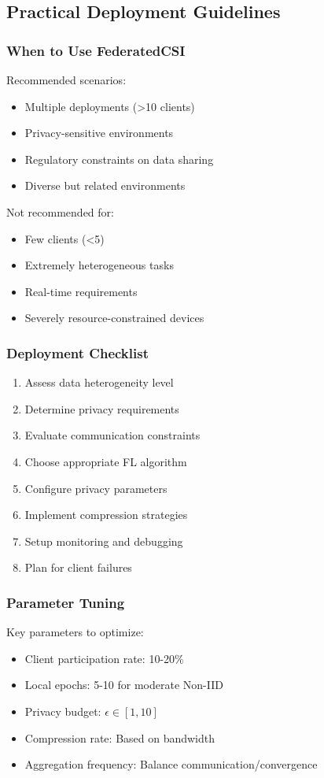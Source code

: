 \documentclass[journal]{IEEEtran}
\begin{document}
\subsection{Practical Deployment Guidelines}

\subsubsection{When to Use FederatedCSI}
Recommended scenarios:
\begin{itemize}
\item Multiple deployments (>10 clients)
\item Privacy-sensitive environments
\item Regulatory constraints on data sharing
\item Diverse but related environments
\end{itemize}

Not recommended for:
\begin{itemize}
\item Few clients (<5)
\item Extremely heterogeneous tasks
\item Real-time requirements
\item Severely resource-constrained devices
\end{itemize}

\subsubsection{Deployment Checklist}
\begin{enumerate}
\item Assess data heterogeneity level
\item Determine privacy requirements
\item Evaluate communication constraints
\item Choose appropriate FL algorithm
\item Configure privacy parameters
\item Implement compression strategies
\item Setup monitoring and debugging
\item Plan for client failures
\end{enumerate}

\subsubsection{Parameter Tuning}
Key parameters to optimize:
\begin{itemize}
\item Client participation rate: 10-20\%
\item Local epochs: 5-10 for moderate Non-IID
\item Privacy budget: $\epsilon \in [1, 10]$
\item Compression rate: Based on bandwidth
\item Aggregation frequency: Balance communication/convergence
\end{itemize}
\end{document}
